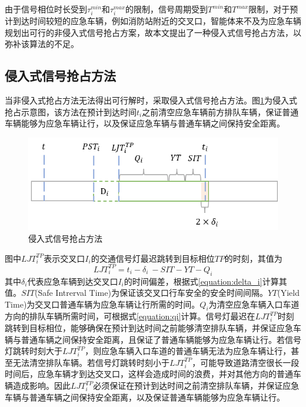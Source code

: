 由于信号相位时长受到${\tau_i^{min}}$和${\tau_i^{max}}$的限制，信号周期受到${T^{min}}$和${T^{max}}$限制，对于预计到达时间较短的应急车辆，例如消防站附近的交叉口，智能体来不及为应急车辆规划出可行的非侵入式信号抢占方案，故本文提出了一种侵入式信号抢占方法，以弥补该算法的不足。

\subsection{侵入式信号抢占方法}
当非侵入式抢占方法无法得出可行解时，采取侵入式信号抢占方法。图\ref{fig:invasive}为侵入式抢占示意图，该方法在预计到达时间${t_i}$之前清空应急车辆前方排队车辆，保证普通车辆能够为应急车辆让行，以及保证应急车辆与普通车辆之间保持安全距离。

\begin{figure}[ht]
	\centering
	\includegraphics[width=\textwidth]{figures/invasive.png}
	\caption{侵入式信号抢占方法}
	\label{fig:invasive}
\end{figure}

图中${{LJT}_i^{TP}}$表示交叉口${I_i}$的交通信号灯最迟跳转到目标相位${TP}$的时刻，其值为
\begin{equation}
	\label{equation:D_i}
	{LJT}_i^{TP}=t_i-\delta_i\ -SIT-YT-Q_i
\end{equation}
其中${\delta_i}$代表应急车辆到达交叉口${I_i}$的时间偏差，根据式\ref{equation:delta_i}计算其值。${SIT}$(Safe Intrerval Time)为保证该交叉口行车安全的安全时间间隔。${YT}$(Yield Time)为交叉口普通车辆为应急车辆让行所需的时间。${Q_i}$为清空应急车辆入口车道方向的排队车辆所需时间，可根据式\ref{equation:qi}计算。信号灯最迟在${{LJT}_i^{TP}}$时刻跳转到目标相位，能够确保在预计到达时间之前能够清空排队车辆，并保证应急车辆与普通车辆之间保持安全距离，且保证了普通车辆能够为应急车辆让行。若信号灯跳转时刻大于${{LJT}_i^{TP}}$，则应急车辆入口车道的普通车辆无法为应急车辆让行，甚至无法清空排队车辆。若信号灯跳转时刻小于${{LJT}_i^{TP}}$，可能导致道路清空很长一段时间后，应急车辆才到达交叉口，这样会造成时间的浪费，并对其他方向的普通车辆造成影响。因此${{LJT}_i^{TP}}$必须保证在预计到达时间之前清空排队车辆，并保证应急车辆与普通车辆之间保持安全距离，以及保证普通车辆能够为应急车辆让行。


